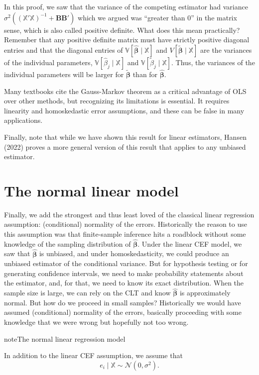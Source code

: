 \documentclass[
  13pt,
  letterpaper,
  DIV=11,
  numbers=noendperiod]{scrreprt}
\newcommand{\mb}{\bm}
\newcommand{\V}{\mathbb{V}}
\newcommand{\N}{\mathcal{N}}
\newcommand{\Xmat}{\mathbb{X}}
\newcommand{\bfbeta}{\mb{\beta}}
\newcommand{\bhat}{\widehat{\mb{\beta}}}
\theoremstyle{plain}
\theoremstyle{plain}
\theoremstyle{definition}
\theoremstyle{definition}
\theoremstyle{remark}
\begin{document}
In this proof, we saw that the variance of the competing estimator had
variance
\(\sigma^2\left(\left(\Xmat'\Xmat\right)^{-1} + \mb{BB}'\right)\) which
we argued was ``greater than 0'' in the matrix sense, which is also
called positive definite. What does this mean practically? Remember that
any positive definite matrix must have strictly positive diagonal
entries and that the diagonal entries of \(\V[\bhat \mid \Xmat]\) and
\(V[\widetilde{\bfbeta}\mid \Xmat]\) are the variances of the individual
parameters, \(\V[\widehat{\beta}_{j} \mid \Xmat]\) and
\(\V[\widetilde{\beta}_{j} \mid \Xmat]\). Thus, the variances of the
individual parameters will be larger for \(\widetilde{\bfbeta}\) than
for \(\bhat\).

Many textbooks cite the Gauss-Markov theorem as a critical advantage of
OLS over other methods, but recognizing its limitations is essential. It
requires linearity and homoskedastic error assumptions, and these can be
false in many applications.

Finally, note that while we have shown this result for linear
estimators, Hansen (2022) proves a more general version of this result
that applies to any unbiased estimator.

\section{The normal linear model}\label{the-normal-linear-model}

Finally, we add the strongest and thus least loved of the classical
linear regression assumption: (conditional) normality of the errors.
Historically the reason to use this assumption was that finite-sample
inference hits a roadblock without some knowledge of the sampling
distribution of \(\bhat\). Under the linear CEF model, we saw that
\(\bhat\) is unbiased, and under homoskedasticity, we could produce an
unbiased estimator of the conditional variance. But for hypothesis
testing or for generating confidence intervals, we need to make
probability statements about the estimator, and, for that, we need to
know its exact distribution. When the sample size is large, we can rely
on the CLT and know \(\bhat\) is approximately normal. But how do we
proceed in small samples? Historically we would have assumed
(conditional) normality of the errors, basically proceeding with some
knowledge that we were wrong but hopefully not too wrong.

\begin{bookcallout}{note}{The normal linear regression model}

In addition to the linear CEF assumption, we assume that \[
e_i \mid \Xmat \sim \N(0, \sigma^2).
\]

\end{bookcallout}
\end{document}
